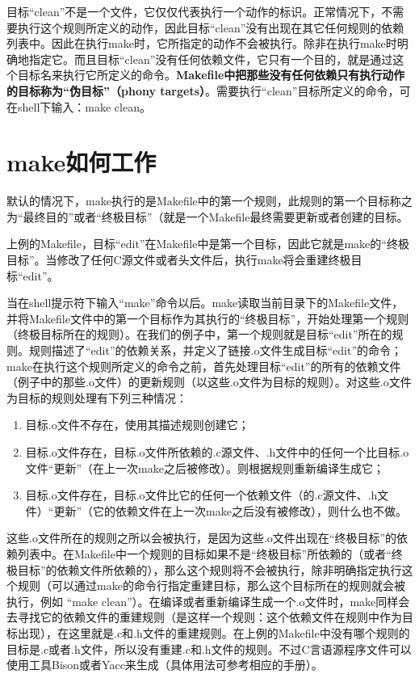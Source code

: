目标“clean”不是一个文件，它仅仅代表执行一个动作的标识。正常情况下，不需要执行这个规则所定义的动作，因此目标“clean”没有出现在其它任何规则的依赖列表中。因此在执行make时，它所指定的动作不会被执行。除非在执行make时明确地指定它。而且目标“clean”没有任何依赖文件，它只有一个目的，就是通过这个目标名来执行它所定义的命令。\textbf{Makefile中把那些没有任何依赖只有执行动作的目标称为“伪目标”（phony targets）}。需要执行“clean”目标所定义的命令，可在shell下输入：make clean。


\section{make如何工作}

默认的情况下，make执行的是Makefile中的第一个规则，此规则的第一个目标称之为“最终目的”或者“终极目标”（就是一个Makefile最终需要更新或者创建的目标。

上例的Makefile，目标“edit”在Makefile中是第一个目标，因此它就是make的“终极目标”。当修改了任何C源文件或者头文件后，执行make将会重建终极目标“edit”。

当在shell提示符下输入“make”命令以后。make读取当前目录下的Makefile文件，并将Makefile文件中的第一个目标作为其执行的“终极目标”，开始处理第一个规则（终极目标所在的规则）。在我们的例子中，第一个规则就是目标“edit”所在的规则。规则描述了“edit”的依赖关系，并定义了链接.o文件生成目标“edit”的命令； make在执行这个规则所定义的命令之前，首先处理目标“edit”的所有的依赖文件（例子中的那些.o文件）的更新规则（以这些.o文件为目标的规则）。对这些.o文件为目标的规则处理有下列三种情况：
\begin{enumerate}
\itemsep=0pt \parskip=0pt
    \item 目标.o文件不存在，使用其描述规则创建它；
    \item 目标.o文件存在，目标.o文件所依赖的.c源文件、.h文件中的任何一个比目标.o文件“更新”（在上一次make之后被修改）。则根据规则重新编译生成它；
    \item 目标.o文件存在，目标.o文件比它的任何一个依赖文件（的.c源文件、.h文件）“更新”（它的依赖文件在上一次make之后没有被修改），则什么也不做。
\end{enumerate}

这些.o文件所在的规则之所以会被执行，是因为这些.o文件出现在“终极目标”的依赖列表中。在Makefile中一个规则的目标如果不是“终极目标”所依赖的（或者“终极目标”的依赖文件所依赖的），那么这个规则将不会被执行，除非明确指定执行这个规则（可以通过make的命令行指定重建目标，那么这个目标所在的规则就会被执行，例如 “make clean”）。在编译或者重新编译生成一个.o文件时，make同样会去寻找它的依赖文件的重建规则（是这样一个规则：这个依赖文件在规则中作为目标出现），在这里就是.c和.h文件的重建规则。在上例的Makefile中没有哪个规则的目标是.c或者.h文件，所以没有重建.c和.h文件的规则。不过C言语源程序文件可以使用工具Bison或者Yacc来生成（具体用法可参考相应的手册）。

